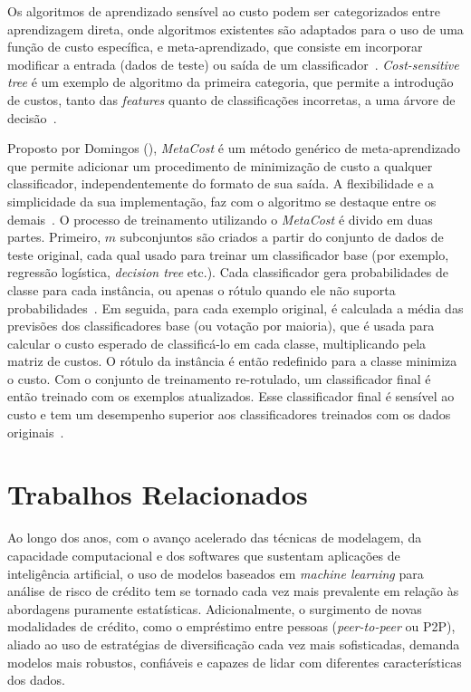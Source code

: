 Os algoritmos de aprendizado sensível ao custo podem ser categorizados entre aprendizagem direta, onde algoritmos existentes são adaptados para o uso de uma função de custo específica, e meta-aprendizado, que consiste em incorporar modificar a entrada (dados de teste) ou saída de um classificador~\cite{FernndezCs2018}. \textit{Cost-sensitive tree} é um exemplo de algoritmo da primeira categoria, que permite a introdução de custos, tanto das \textit{features} quanto de classificações incorretas, a uma árvore de decisão~\cite{Ling2006}.

Proposto por Domingos (\citeyear{Domingos1999}), \textit{MetaCost} é um método genérico de meta-aprendizado que permite adicionar um procedimento de minimização de custo a qualquer classificador, independentemente do formato de sua saída. A flexibilidade e a simplicidade da sua implementação, faz com o algoritmo se destaque entre os demais~\cite[text]{FernndezCs2018, Wang2018}. O processo de treinamento utilizando o \textit{MetaCost} é divido em duas partes. Primeiro, \(m\) subconjuntos são criados a partir do conjunto de dados de teste original, cada qual usado para treinar um classificador base (por exemplo, regressão logística, \textit{decision tree} etc.). Cada classificador gera probabilidades de classe para cada instância, ou apenas o rótulo quando ele não suporta probabilidades~\cite{Araf2024}. Em seguida, para cada exemplo original, é calculada a média das previsões dos classificadores base (ou votação por maioria), que é usada para calcular o custo esperado de classificá-lo em cada classe, multiplicando pela matriz de custos. O rótulo da instância é então redefinido para a classe minimiza o custo. Com o conjunto de treinamento re-rotulado, um classificador final é então treinado com os exemplos atualizados. Esse classificador final é sensível ao custo e tem um desempenho superior aos classificadores treinados com os dados originais~\cite{Chen2021}.

\section{Trabalhos Relacionados}

Ao longo dos anos, com o avanço acelerado das técnicas de modelagem, da capacidade computacional e dos softwares que sustentam aplicações de inteligência artificial, o uso de modelos baseados em \textit{machine learning} para análise de risco de crédito tem se tornado cada vez mais prevalente em relação às abordagens puramente estatísticas. Adicionalmente, o surgimento de novas modalidades de crédito, como o empréstimo entre pessoas (\textit{peer-to-peer} ou P2P), aliado ao uso de estratégias de diversificação cada vez mais sofisticadas, demanda modelos mais robustos, confiáveis e capazes de lidar com diferentes características dos dados.

